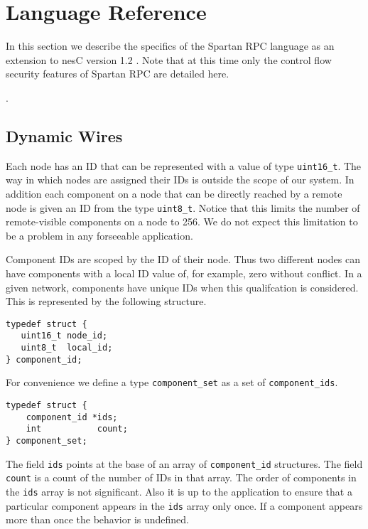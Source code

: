 \section{Language Reference}

In this section we describe the specifics of the Spartan RPC language as an extension to nesC
version 1.2 \cite{nesC12}. Note that at this time only the control flow security features of
Spartan RPC are detailed here.

.

\subsection{Dynamic Wires}
\label{sec:dynamic-wires}

Each node has an ID that can be represented with a value of type \texttt{uint16\_t}. The way in
which nodes are assigned their IDs is outside the scope of our system.  In addition each component on a node that can be
directly reached by a remote node is given an ID from the type \texttt{uint8\_t}. Notice that
this limits the number of remote-visible components on a node to 256. We do not expect this
limitation to be a problem in any forseeable application.

Component IDs are scoped by the ID of their node. Thus two different nodes can have components
with a local ID value of, for example, zero without conflict. In a given network, components
have unique IDs when this qualifcation is considered. This is represented by the following
structure.
\begin{verbatim}
typedef struct {
   uint16_t node_id;
   uint8_t  local_id;
} component_id;
\end{verbatim}

For convenience we define a type \texttt{component\_set} as a set of \texttt{component\_ids}.

\begin{verbatim}
typedef struct {
    component_id *ids;
    int           count;
} component_set;
\end{verbatim}

The field \texttt{ids} points at the base of an array of \texttt{component\_id} structures. The
field \texttt{count} is a count of the number of IDs in that array. The order of components in
the \texttt{ids} array is not significant. Also it is up to the application to ensure that a
particular component appears in the \texttt{ids} array only once. If a component appears more
than once the behavior is undefined.

